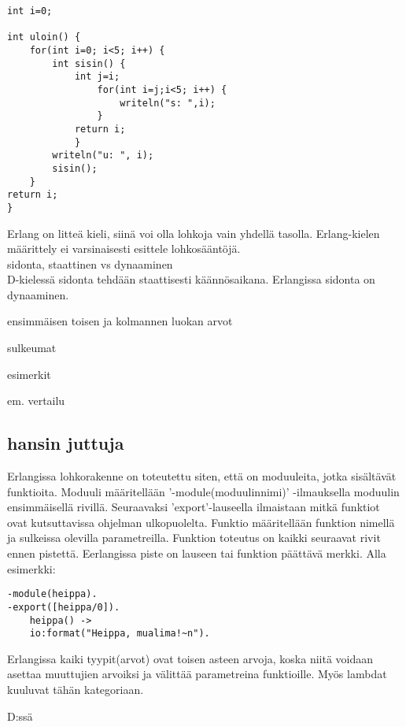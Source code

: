 \documentclass[11pt,oneside,a4paper]{article}
\begin{document}
\begin{verbatim}
int i=0;

int uloin() {
    for(int i=0; i<5; i++) {
        int sisin() {
            int j=i;
                for(int i=j;i<5; i++) {
                    writeln("s: ",i);
                }
            return i;
            }
        writeln("u: ", i);
        sisin();
    }
return i;
}
\end{verbatim}

Erlang on litteä kieli, siinä voi olla lohkoja vain yhdellä tasolla.
Erlang-kielen määrittely ei varsinaisesti esittele lohkosääntöjä. \\

sidonta, staattinen vs dynaaminen \\
D-kielessä sidonta tehdään staattisesti käännösaikana. Erlangissa sidonta on
dynaaminen.

ensimmäisen toisen ja kolmannen luokan arvot

sulkeumat

esimerkit

em. vertailu
\subsection{hansin juttuja}
Erlangissa lohkorakenne on toteutettu siten, että on moduuleita, jotka sisältävät funktioita. Moduuli määritellään '-module(moduulin\textunderscore nimi)' -ilmauksella moduulin ensimmäisellä rivillä.
Seuraavaksi 'export'-lauseella ilmaistaan mitkä funktiot ovat kutsuttavissa ohjelman ulkopuolelta. Funktio määritellään funktion nimellä ja sulkeissa olevilla parametreilla. Funktion toteutus
on kaikki seuraavat rivit ennen pistettä. Eerlangissa piste on lauseen tai funktion päättävä merkki. Alla esimerkki:
\begin{verbatim}
-module(heippa).
-export([heippa/0]).
    heippa() ->
    io:format("Heippa, mualima!~n").
\end{verbatim}

Erlangissa kaiki tyypit(arvot) ovat toisen asteen arvoja, koska niitä voidaan asettaa muuttujien arvoiksi ja välittää parametreina funktioille.
Myös lambdat kuuluvat tähän kategoriaan. 

D:ssä 
\end{document}

